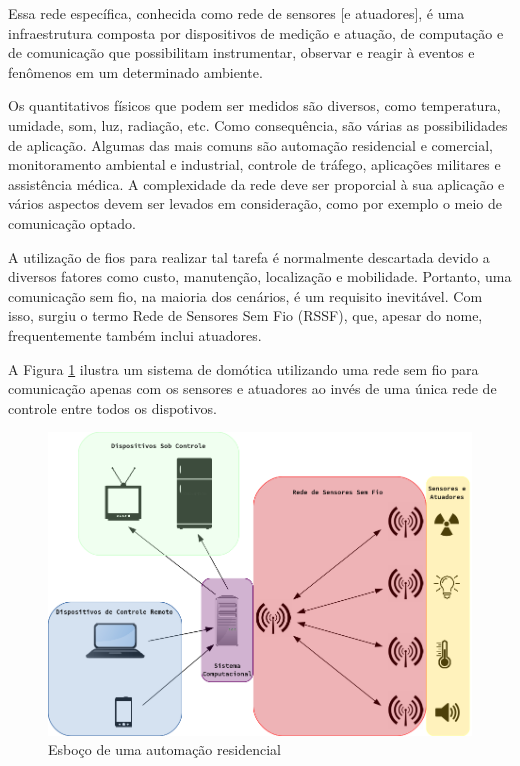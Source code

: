 \documentclass[
    12pt,               %
    a4paper,            %
    english,            %
    brazil,             %
    ]{article}
\begin{document}
Essa rede específica, conhecida como rede de sensores [e atuadores], é uma infraestrutura composta por dispositivos de medição e
atuação, de computação e de comunicação que possibilitam instrumentar, observar e reagir à eventos e fenômenos em um determinado
ambiente. \cite{sohraby_minoli_znati2007}

Os quantitativos físicos que podem ser medidos são diversos, como temperatura, umidade, som, luz, radiação, etc. Como
consequência, são várias as possibilidades de aplicação. Algumas das mais comuns são automação residencial e comercial,
monitoramento ambiental e industrial, controle de tráfego, aplicações militares e assistência médica. A complexidade da rede deve
ser proporcial à sua aplicação e vários aspectos devem ser levados em consideração, como por exemplo o meio de comunicação optado.
\cite{kuorilehto2007}

A utilização de fios para realizar tal tarefa é normalmente descartada devido a diversos fatores como custo, manutenção,
localização e mobilidade. Portanto, uma comunicação sem fio, na maioria dos cenários, é um requisito inevitável. Com isso, surgiu
o termo Rede de Sensores Sem Fio (RSSF), que, apesar do nome, frequentemente também inclui atuadores.  \cite{karl_willig2005}

A Figura \ref{figura:wsn} ilustra um sistema de domótica utilizando uma rede sem fio para comunicação apenas com os sensores e
atuadores ao invés de uma única rede de controle entre todos os dispotivos.

\begin{figure}[H]
	\centering
	\includegraphics[width=\textwidth]{images/wsn.png}
	\caption{Esboço de uma automação residencial}
	\label{figura:wsn}
\end{figure}
\end{document}
